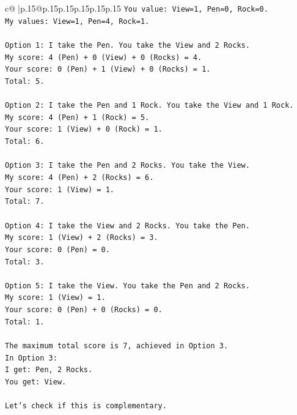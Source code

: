 \documentclass{article}
\begin{document}
{\begin{supertabular}{c@{$\;$}|p{.15\linewidth}@{}p{.15\linewidth}p{.15\linewidth}p{.15\linewidth}p{.15\linewidth}p{.15\linewidth}}
{{{\texttt{You value: View=1, Pen=0, Rock=0.} \\
\texttt{My values: View=1, Pen=4, Rock=1.} \\
\\ 
\texttt{Option 1: I take the Pen. You take the View and 2 Rocks.} \\
\texttt{My score: 4 (Pen) + 0 (View) + 0 (Rocks) = 4.} \\
\texttt{Your score: 0 (Pen) + 1 (View) + 0 (Rocks) = 1.} \\
\texttt{Total: 5.} \\
\\ 
\texttt{Option 2: I take the Pen and 1 Rock. You take the View and 1 Rock.} \\
\texttt{My score: 4 (Pen) + 1 (Rock) = 5.} \\
\texttt{Your score: 1 (View) + 0 (Rock) = 1.} \\
\texttt{Total: 6.} \\
\\ 
\texttt{Option 3: I take the Pen and 2 Rocks. You take the View.} \\
\texttt{My score: 4 (Pen) + 2 (Rocks) = 6.} \\
\texttt{Your score: 1 (View) = 1.} \\
\texttt{Total: 7.} \\
\\ 
\texttt{Option 4: I take the View and 2 Rocks. You take the Pen.} \\
\texttt{My score: 1 (View) + 2 (Rocks) = 3.} \\
\texttt{Your score: 0 (Pen) = 0.} \\
\texttt{Total: 3.} \\
\\ 
\texttt{Option 5: I take the View. You take the Pen and 2 Rocks.} \\
\texttt{My score: 1 (View) = 1.} \\
\texttt{Your score: 0 (Pen) + 0 (Rocks) = 0.} \\
\texttt{Total: 1.} \\
\\ 
\texttt{The maximum total score is 7, achieved in Option 3.} \\
\texttt{In Option 3:} \\
\texttt{I get: Pen, 2 Rocks.} \\
\texttt{You get: View.} \\
\\ 
\texttt{Let's check if this is complementary.} \\
}}}
\end{supertabular}}
\end{document}
